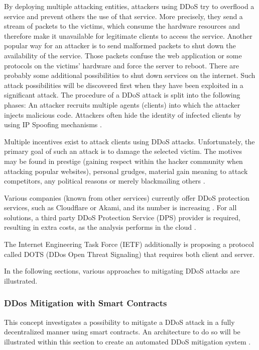 By deploying multiple attacking entities, attackers using DDoS try to overflood a service and prevent others the use of that service. More precisely, they send a stream of packets to the victims, which consume the hardware resources and therefore make it unavailable for legitimate clients to access the service. Another popular way for an attacker is to send malformed packets to shut down the availability of the service. Those packets confuse the web application or some protocols on the victims' hardware and force the server to reboot. There are probably some additional possibilities to shut down services on the internet. Such attack possibilities will be discovered first when they have been exploited in a significant attack. The procedure of a DDoS attack is split into the following phases: An attacker recruits multiple agents (clients) into which the attacker injects malicious code. Attackers often hide the identity of infected clients by using IP Spoofing mechanisms \cite{Mirkovic2004}.


Multiple incentives exist to attack clients using DDoS attacks. Unfortunately, the primary goal of such an attack is to damage the selected victim. The motives may be found in prestige (gaining respect within the hacker community when attacking popular websites), personal grudges, material gain meaning to attack competitors, any political reasons or merely blackmailing others \cite{Mirkovic2004}.


Various companies (known from other services) currently offer DDoS protection services, such as Cloudflare or Akami, and its number is increasing \cite{Pras2016}. For all solutions, a third party DDoS Protection Service (DPS) provider is required, resulting in extra costs, as the analysis performs in the cloud \cite{Rodrigues2017}.

The Internet Engineering Task Force (IETF) additionally is proposing a protocol called DOTS (DDos Open Threat Signaling) that requires both client and server.

In the following sections, various approaches to mitigating DDoS attacks are illustrated.


\subsubsection{DDos Mitigation with Smart Contracts}
This concept investigates a possibility to mitigate a DDoS attack in a fully decentralized manner using smart contracts. An architecture to do so will be illustrated within this section to create an automated DDoS mitigation system \cite{Rodrigues2017}.

